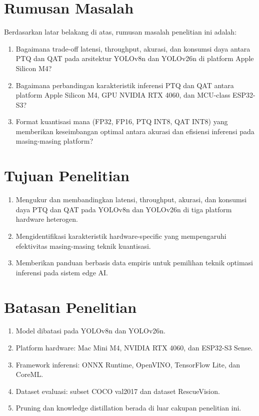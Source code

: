 \documentclass[12pt, a4paper]{report}
\begin{document}
\section{Rumusan Masalah}

Berdasarkan latar belakang di atas, rumusan masalah penelitian ini adalah:
\begin{enumerate}
  \item Bagaimana trade-off latensi, throughput, akurasi, dan konsumsi daya
    antara PTQ dan QAT pada arsitektur YOLOv8n dan YOLOv26n di platform Apple Silicon M4?
  \item Bagaimana perbandingan karakteristik inferensi PTQ dan QAT antara
    platform Apple Silicon M4, GPU NVIDIA RTX 4060, dan MCU-class ESP32-S3?
  \item Format kuantisasi mana (FP32, FP16, PTQ INT8, QAT INT8) yang memberikan
    keseimbangan optimal antara akurasi dan efisiensi inferensi pada masing-masing platform?
\end{enumerate}

\section{Tujuan Penelitian}

\begin{enumerate}
  \item Mengukur dan membandingkan latensi, throughput, akurasi, dan konsumsi daya
    PTQ dan QAT pada YOLOv8n dan YOLOv26n di tiga platform hardware heterogen.
  \item Mengidentifikasi karakteristik hardware-specific yang mempengaruhi
    efektivitas masing-masing teknik kuantisasi.
  \item Memberikan panduan berbasis data empiris untuk pemilihan teknik
    optimasi inferensi pada sistem edge AI.
\end{enumerate}

\section{Batasan Penelitian}

\begin{enumerate}
  \item Model dibatasi pada YOLOv8n dan YOLOv26n.
  \item Platform hardware: Mac Mini M4, NVIDIA RTX 4060, dan ESP32-S3 Sense.
  \item Framework inferensi: ONNX Runtime, OpenVINO, TensorFlow Lite, dan CoreML.
  \item Dataset evaluasi: subset COCO val2017 dan dataset RescueVision.
  \item Pruning dan knowledge distillation berada di luar cakupan penelitian ini.
\end{enumerate}
\end{document}
